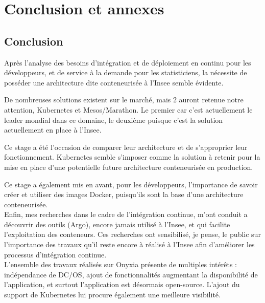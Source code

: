 \documentclass[11pt,fleqn]{book} %
\begin{document}
\part{\textcolor{ocre}{Conclusion et annexes}}
\chapter{Conclusion}
\vspace{-2cm}

Après l'analyse des besoins d'intégration et de déploiement en continu pour les développeurs, et de service à la demande pour les statisticiens, la nécessite de posséder une architecture dite conteneurisée à l'Insee semble évidente. \newline

De nombreuses solutions existent sur le marché, mais 2 auront retenue notre attention, Kubernetes et Mesos/Marathon. Le premier car c'est actuellement le leader mondial dans ce domaine, le deuxième puisque c'est la solution actuellement en place à l'Insee. \newline

Ce stage a été l'occasion de comparer leur architecture et de s'approprier leur fonctionnement. Kubernetes semble s'imposer comme la solution à retenir pour la mise en place d'une potentielle future architecture conteneurisée en production.\newline

Ce stage a également mis en avant, pour les développeurs, l'importance  de savoir créer et utiliser des images Docker, puisqu'ils sont la base d'une architecture conteneurisée.\\

Enfin, mes recherches dans le cadre de l'intégration continue, m'ont conduit a découvrir des outils (Argo), encore jamais utilisé à l'Insee, et qui facilite l'exploitation des conteneurs. Ces recherches ont sensibilisé, je pense, le public sur l'importance des travaux qu'il reste encore à réalisé à l'Insee afin d'améliorer les processus d'intégration continue.\\

L'ensemble des travaux réalisés sur Onyxia présente de multiples intérêts : indépendance de DC/OS, ajout de fonctionnalités augmentant la disponibilité de l'application, et surtout l'application est désormais open-source. L'ajout du support de Kubernetes lui procure également une meilleure visibilité.\\
\end{document}

